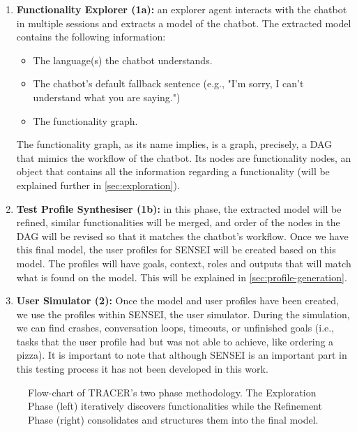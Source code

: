 \begin{enumerate}
  \item \textbf{Functionality Explorer (1a):}
    an explorer agent interacts with the chatbot in multiple sessions
    and extracts a model of the chatbot.
    The extracted model contains the following information:
    \begin{itemize}
      \item The language(s) the chatbot understands.
      \item The chatbot's default fallback sentence (e.g., "I'm sorry, I can't understand what you are saying.")
      \item The functionality graph.
    \end{itemize}

    The functionality graph, as its name implies,
    is a graph, precisely, a \ac{DAG}
    that mimics the workflow of the chatbot.
    Its nodes are functionality nodes,
    an object that contains all the information regarding a functionality
    (will be explained further in
    \autoref{sec:exploration}).

  \item \textbf{Test Profile Synthesiser (1b):}
    in this phase, the extracted model will be refined,
    similar functionalities will be merged,
    and order of the nodes in the \ac{DAG} will be revised
    so that it matches the chatbot's workflow.
    Once we have this final model,
    the user profiles for SENSEI will be created based on this model.
    The profiles will have goals, context, roles and outputs
    that will match what is found on the model.
    This will be explained in \autoref{sec:profile-generation}.

  \item \textbf{User Simulator (2):}
    Once the model and user profiles have been created,
    we use the profiles within SENSEI, the user simulator.
    During the simulation,
    we can find crashes, conversation loops, timeouts,
    or unfinished goals (i.e., tasks that the user profile had
    but was not able to achieve, like ordering a pizza).
    It is important to note that
    although SENSEI is an important part in this testing process
    it has not been developed in this work.
\end{enumerate}


\begin{figure}[!htbp]
    \centering
    
    \caption{Flow-chart of TRACER's two phase methodology.
    The Exploration Phase (left) iteratively discovers functionalities
    while the Refinement Phase (right) consolidates and structures them into the final model.}
    \label{fig:flowchart-tracer}
\end{figure}


